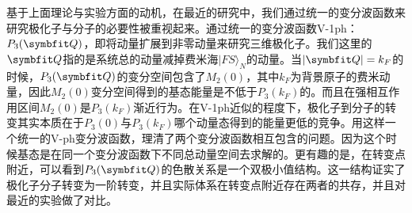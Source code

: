 基于上面理论与实验方面的动机，在最近的研究中，我们通过统一的变分波函数来研究极化子与分子的必要性被重视起来\cite{Cui2020Fermi}。通过统一的变分波函数V-1ph：$P_3(\Vector{Q})$，即将动量扩展到非零动量来研究三维极化子。我们这里的$\Vector{Q}$指的是系统总的动量减掉费米海$|FS\rangle_N$的动量。当$|\Vector{Q}|=k_F$的时候，$P_3(\Vector{Q})$的变分空间包含了$M_2(0)$，其中$k_F$为背景原子的费米动量，因此$M_2(0)$变分空间得到的基态能量是不低于$P_3(k_F)$的。而且在强相互作用区间$M_2(0)$是$P_3(k_F)$渐近行为。在V-1ph近似的程度下，极化子到分子的转变其实本质在于$P_3(0)$与$P_3(k_F)$哪个动量态得到的能量更低的竞争。用这样一个统一的V-ph变分波函数，理清了两个变分波函数相互包含\cite{edwards2013smooth}的问题。因为这个时候基态是在同一个变分波函数下不同总动量空间去求解的。更有趣的是，在转变点附近，可以看到$P_3(\Vector{Q})$的色散关系是一个双极小值结构。这一结构证实了极化子分子转变为一阶转变，并且实际体系在转变点附近存在两者的共存，并且对最近的实验做了对比。

